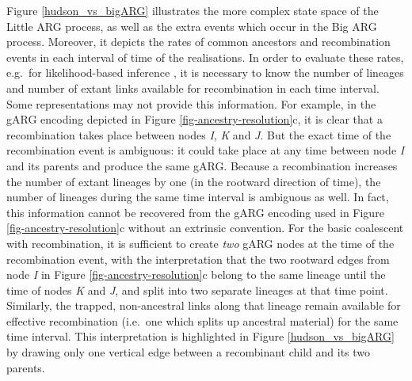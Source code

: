 \documentclass[9pt,twocolumn,twoside]{gsajnl}
\newcommand{\noderef}[1]{\textit{#1}}
\begin{document}
Figure \ref{hudson_vs_bigARG} illustrates the more complex state space
of the Little ARG process, as well as the extra events which occur in the Big ARG process.
Moreover, it depicts the rates of common ancestors and recombination events in each
interval of time of the realisations.
In order to evaluate these rates, e.g.\ for likelihood-based inference
\citep{baumdicker2021efficient, mahmoudi2022bayesian},
it is necessary to know the number of lineages and number of extant links
available for recombination in each time interval.
Some representations may not provide this information.
For example, in the gARG encoding depicted in Figure \ref{fig-ancestry-resolution}c,
it is clear that a recombination takes place between nodes \noderef{I}, \noderef{K} and \noderef{J}.
But the exact time of the recombination event is ambiguous: it could take place at any time between node \noderef{I} and its parents and produce the same gARG.
Because a recombination increases the number of extant lineages by one (in the rootward direction of time), the number of lineages during the same time interval is ambiguous as well.
In fact, this information cannot be recovered from the gARG encoding used in Figure \ref{fig-ancestry-resolution}c without an extrinsic convention.
For the basic coalescent with recombination,
it is sufficient to create \emph{two} gARG nodes at the time of the recombination event, with the interpretation that the two rootward edges from node \noderef{I} in Figure \ref{fig-ancestry-resolution}c belong to the same lineage until the time of nodes \noderef{K} and \noderef{J}, and split into two separate lineages at that time point.
Similarly, the trapped, non-ancestral links along that lineage remain available for effective recombination (i.e.\ one which splits up ancestral material) for the same time interval.
This interpretation is highlighted in
Figure \ref{hudson_vs_bigARG} by drawing only one vertical edge between a recombinant child and its two parents.


\end{document}
